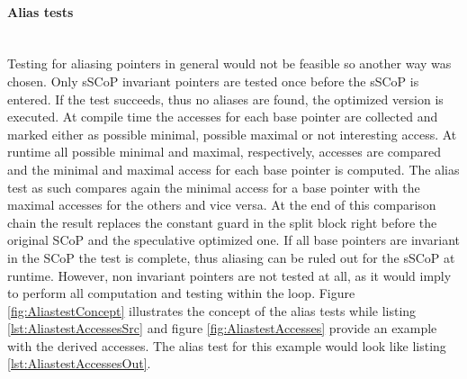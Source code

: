 \paragraph{Alias tests \\} 
~\\

Testing for aliasing pointers in general would not be feasible so another way 
was chosen. Only sSCoP invariant pointers are tested once before the sSCoP is
entered. If the test succeeds, thus no aliases are found, the optimized version
is executed. At compile time the accesses for each base pointer are collected and
marked either as possible minimal, possible maximal or not interesting access. At 
runtime all possible minimal and maximal, respectively, accesses are compared 
and the minimal and maximal access for each base pointer is computed. The alias 
test as such compares again the minimal access for a base pointer with the maximal 
accesses for the others and vice versa. At the end of this comparison chain the 
result replaces the constant guard in the split block right before the original SCoP 
and the speculative optimized one. If all base pointers are invariant in the
SCoP the test is complete, thus aliasing can be ruled out for the sSCoP at
runtime. However, non invariant pointers are not tested at all, as it would 
imply to perform all computation and testing within the loop. 
Figure \ref{fig:AliastestConcept} illustrates the concept of the alias
tests while listing \ref{lst:AliastestAccessesSrc} and figure
\ref{fig:AliastestAccesses} provide an example with the derived accesses. 
The alias test for this example would look like listing
\ref{lst:AliastestAccessesOut}.



